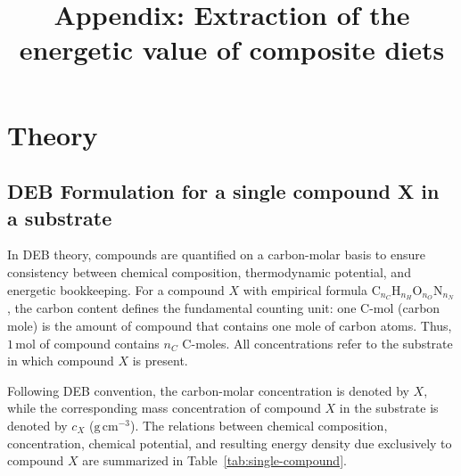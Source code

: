 \documentclass[11pt]{article}
\title{Appendix: Extraction of the energetic value of composite diets}
\author{}
\date{}
\begin{document}
\maketitle

\section*{Theory}

\subsection*{DEB Formulation for a single compound X in a substrate}

In DEB theory, compounds are quantified on a carbon-molar basis to ensure consistency between chemical composition, thermodynamic potential, and energetic bookkeeping. For a compound $X$ with empirical formula $\mathrm{C}_{n_C}\mathrm{H}_{n_H}\mathrm{O}_{n_O}\mathrm{N}_{n_N}$, the carbon content defines the fundamental counting unit: one C-mol (carbon mole) is the amount of compound that contains one mole of carbon atoms. Thus, $1\,\mathrm{mol}$ of compound contains $n_C$ C-moles. All concentrations refer to the substrate in which compound $X$ is present.

Following DEB convention, the carbon-molar concentration is denoted by $X$, while the corresponding mass concentration of compound $X$ in the substrate is denoted by $c_X$ ($\mathrm{g\,cm^{-3}}$). The relations between chemical composition, concentration, chemical potential, and resulting energy density due exclusively to compound $X$ are summarized in Table~\ref{tab:single-compound}.
\end{document}
